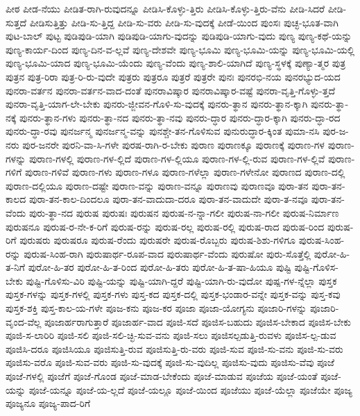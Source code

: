 {ಪೀಠ
ಪೀಡ-ನೆಯು
ಪೀಡಿತ-ರಾಗಿ-ರುವುದನ್ನೂ
ಪೀಡಿಸಿ-ಕೊಳ್ಳು-ತ್ತಿರು
ಪೀಡಿಸಿ-ಕೊಳ್ಳು-ತ್ತಿರು-ವೆನು
ಪೀಡಿ-ಸಿದರೆ
ಪೀಡಿ-ಸುತ್ತದೆ
ಪೀಡಿಸುತ್ತಿತ್ತು
ಪೀಡಿ-ಸು-ತ್ತಿದ್ದ
ಪೀಡಿ-ಸು-ವರು
ಪೀಡಿ-ಸು-ವುದಕ್ಕೆ
ಪೀಡೆ-ಯಿಂದ
ಪುಂಸಃ
ಪುಚ್ಛ-ಭೂತ-ವಾಗಿ
ಪುಟ-ಬಾಲ್
ಪುಟ್ಟ
ಪುಡಿಪುಡಿ-ಯಾಗಿ
ಪುಡಿಪುಡಿ-ಯಾಗು-ವುದನ್ನು
ಪುಡಿಪುಡಿ-ಯಾಗು-ವುದು
ಪುಣ್ಯ
ಪುಣ್ಯ-ಕಥೆ-ಯನ್ನು
ಪುಣ್ಯ-ಕಾರ್ಯ-ದಿಂದ
ಪುಣ್ಯ-ದಿನ-ವ-ಲ್ಲವೆ
ಪುಣ್ಯ-ದೇಶವೇ
ಪುಣ್ಯ-ಭೂಮಿ
ಪುಣ್ಯ-ಭೂಮಿ-ಯನ್ನು
ಪುಣ್ಯ-ಭೂಮಿ-ಯಲ್ಲಿ
ಪುಣ್ಯ-ಭೂಮಿ-ಯಾದ
ಪುಣ್ಯ-ಭೂಮಿ-ಯೆಂದು
ಪುಣ್ಯ-ವೆಂದು
ಪುಣ್ಯ-ಶಾಲಿ-ಯಾಗಿದೆ
ಪುಣ್ಯ-ಸ್ಥಳಕ್ಕೆ
ಪುಣ್ಯಾ-ತ್ಮರ
ಪುತ್ರ
ಪುತ್ರನ
ಪುತ್ರ-ರಿರಾ
ಪುತ್ರ-ರಿ-ರು-ವುದೇ
ಪುತ್ರರು
ಪುತ್ರರೂ
ಪುತ್ರರೆ
ಪುತ್ರರೇ
ಪುನಃ
ಪುನರಭಿ-ನಯ
ಪುನರಭ್ಯುದ-ಯದ
ಪುನರಾ-ವರ್ತನ
ಪುನರಾ-ವರ್ತನ-ವಾದ-ದಂತೆ
ಪುನರಾವಿಷ್ಕಾರ
ಪುನರಾವಿಷ್ಕಾರ-ವಷ್ಟೆ
ಪುನರಾ-ವೃತ್ತಿ-ಗೊಳ್ಳು-ತ್ತದೆ
ಪುನರಾ-ವೃತ್ತಿ-ಯಾಗ-ಲೇ-ಬೇಕು
ಪುನರು-ಜ್ಜೀವನ-ಗೊಳಿ-ಸು-ವುದಕ್ಕೆ
ಪುನರು-ತ್ಥಾನ
ಪುನರು-ತ್ಥಾನ-ಕ್ಕಾಗಿ
ಪುನರು-ತ್ಥಾ-ನಕ್ಕೆ
ಪುನರು-ತ್ಥಾನ-ಗಳು
ಪುನರು-ತ್ಥಾ-ನದ
ಪುನರು-ತ್ಥಾ-ನವು
ಪುನರು-ದ್ಧಾರ
ಪುನರು-ದ್ಧಾರ-ಕ್ಕಾಗಿ
ಪುನರು-ದ್ಧಾ-ರದ
ಪುನರು-ದ್ಧಾ-ರವು
ಪುನರ್ಜನ್ಮ
ಪುನರ್ಜನ್ಮ-ವನ್ನು
ಪುನಶ್ಚೇ-ತನ-ಗೊಳಿಸುವ
ಪುನುರುದ್ಧಾರ-ಕ್ಕಿಂತ
ಪುಮಾ-ನಸಿ
ಪುರ-ಜ-ನರು
ಪುರ-ಜನರೇ
ಪುರನಿ-ವಾ-ಸಿ-ಗಳೇ
ಪುರಷ-ರಾಗಿ-ರ-ಬೇಕು
ಪುರಾಣ
ಪುರಾಣಕ್ಕೂ
ಪುರಾಣಕ್ಕೆ
ಪುರಾಣ-ಗಳ
ಪುರಾಣ-ಗಳನ್ನು
ಪುರಾಣ-ಗಳಲ್ಲಿ
ಪುರಾಣ-ಗಳ-ಲ್ಲಿದೆ
ಪುರಾಣ-ಗಳ-ಲ್ಲಿಯೂ
ಪುರಾಣ-ಗಳ-ಲ್ಲಿ-ರುವ
ಪುರಾಣ-ಗಳ-ಲ್ಲಿವೆ
ಪುರಾಣ-ಗಳಿಗೆ
ಪುರಾಣ-ಗಳಿವೆ
ಪುರಾಣ-ಗಳು
ಪುರಾಣ-ಗಳೂ
ಪುರಾಣ-ಗಳೆಲ್ಲಾ
ಪುರಾಣ-ಗಳೇನೋ
ಪುರಾಣದ
ಪುರಾಣ-ದಲ್ಲಿ
ಪುರಾಣ-ದಲ್ಲಿಯೂ
ಪುರಾಣ-ದಷ್ಟೇ
ಪುರಾಣ-ವನ್ನು
ಪುರಾಣ-ವನ್ನೂ
ಪುರಾಣವು
ಪುರಾಣವೂ
ಪುರಾ-ತನ
ಪುರಾ-ತನ-ಕಾಲದ
ಪುರಾ-ತನ-ಕಾಲ-ದಿಂದಲೂ
ಪುರಾ-ತನ-ವಾದುದಾ-ದರೂ
ಪುರಾ-ತನ-ವಾದುದೇ
ಪುರಾ-ತ-ನವೂ
ಪುರಾ-ತನ-ವೆಂದು
ಪುರು-ತ್ಥಾ-ನದ
ಪುರುಷ
ಪುರುಷಃ
ಪುರುಷನ
ಪುರುಷ-ನ-ನ್ನಾ-ಗಲೀ
ಪುರುಷ-ನಾ-ಗಲೀ
ಪುರುಷ-ನಿರ್ಮಾಣ
ಪುರುಷನೂ
ಪುರುಷ-ರ-ನೇ-ಕ-ರಿಗೆ
ಪುರುಷ-ರನ್ನು
ಪುರುಷ-ರಲ್ಲ
ಪುರುಷ-ರಲ್ಲಿ
ಪುರುಷ-ರಾದ
ಪುರುಷ-ರಿಂದ
ಪುರುಷ-ರಿಗೆ
ಪುರುಷರು
ಪುರುಷರೂ
ಪುರುಷ-ರೆಂದು
ಪುರುಷರೇ
ಪುರುಷ-ರೊಬ್ಬರು
ಪುರುಷ-ಶಿಶು-ಗಳಿಗೂ
ಪುರುಷ-ಸಿಂಹ-ರನ್ನು
ಪುರುಷ-ಸಿಂಹ-ರಾಗಿ
ಪುರುಷಾರ್ಥ-ರೂಪ-ವಾದ
ಪುರುಷಾರ್ಥ-ವೆಂದು
ಪುರುಷೋ
ಪುರು-ಸೊತ್ತೆಲ್ಲಿ
ಪುರೋ-ಹಿ-ತ-ನಿಗೆ
ಪುರೋ-ಹಿ-ತರ
ಪುರೋ-ಹಿ-ತ-ರಿಂದ
ಪುರೋ-ಹಿ-ತರು
ಪುರೋ-ಹಿ-ತ-ಷಾ-ಹಿಯೂ
ಪುಷ್ಟಿ
ಪುಷ್ಟಿ-ಗೊಳಿಸ-ಬೇಕು
ಪುಷ್ಟಿ-ಗೊಳಿಸು-ವಿರಿ
ಪುಷ್ಟಿ-ಯನ್ನು
ಪುಷ್ಟಿ-ಯಾಗಿ-ದ್ದರೆ
ಪುಷ್ಟಿ-ಯಾಗಿ-ರು-ವುದೋ
ಪುಷ್ಪ-ಗಳ-ನ್ನೆಲ್ಲಾ
ಪುಸ್ತಕ
ಪುಸ್ತಕ-ಗಳನ್ನು
ಪುಸ್ತಕ-ಗಳಲ್ಲಿ
ಪುಸ್ತಕ-ಗಳು
ಪುಸ್ತ-ಕದ
ಪುಸ್ತಕ-ದಲ್ಲಿ
ಪುಸ್ತಕ-ಭಂಡಾರ-ವನ್ನೇ
ಪುಸ್ತಕ-ವನ್ನು
ಪುಸ್ತ-ಕವು
ಪುಸ್ತಕ-ಶಕ್ತಿ
ಪುಸ್ತ-ಕಾಲ-ಯ-ಗಳೇ
ಪೂಜ-ಕನು
ಪೂಜ-ಕರ
ಪೂಜಾ
ಪೂಜಾ-ಯೋಗ್ಯನು
ಪೂಜಾರಿ-ಗಳನ್ನು
ಪೂಜಾರಿ-ವೃಂದ-ವೆಲ್ಲ
ಪೂಜಾರ್ಹರಾಗುತ್ತಾರೆ
ಪೂಜಾರ್ಹ-ವಾದ
ಪೂಜಿ-ಸದೆ
ಪೂಜಿಸ-ಬಹುದು
ಪೂಜಿಸ-ಬೇಕಾದ
ಪೂಜಿಸ-ಬೇಕು
ಪೂಜಿ-ಸ-ಲಾರಿರಿ
ಪೂಜಿ-ಸಲಿ
ಪೂಜಿ-ಸಲಿ-ಚ್ಛಿ-ಸುವ-ವನು
ಪೂಜಿ-ಸಲು
ಪೂಜಿಸಲ್ಪಡುತ್ತಿ-ರುವಳು
ಪೂಜಿಸ-ಲ್ಪ-ಡುವ
ಪೂಜಿಸಿ-ದರೂ
ಪೂಜಿಸಿಯೂ
ಪೂಜಿಸುತ್ತಿ-ರುವ
ಪೂಜಿಸುತ್ತಿ-ರು-ವರು
ಪೂಜಿ-ಸುವ
ಪೂಜಿ-ಸು-ವನು
ಪೂಜಿ-ಸು-ವರು
ಪೂಜಿಸು-ವರೊ
ಪೂಜಿ-ಸುವ-ವರು
ಪೂಜಿ-ಸು-ವುದಕ್ಕೆ
ಪೂಜಿ-ಸು-ವುದಿಲ್ಲ
ಪೂಜಿಸು-ವುದು
ಪೂಜಿಸು-ವೆವು
ಪೂಜೆ
ಪೂಜೆ-ಗಳಲ್ಲಿ
ಪೂಜೆಗೆ
ಪೂಜೆ-ಗೊಂಡ
ಪೂಜೆ-ಮಾಡ-ಬೇಕೆಂದು
ಪೂಜೆ-ಮಾಡುವ
ಪೂಜೆಯ
ಪೂಜೆ-ಯಂತೆ
ಪೂಜೆ-ಯನ್ನು
ಪೂಜೆ-ಯನ್ನೂ
ಪೂಜೆ-ಯ-ಲ್ಲದೆ
ಪೂಜೆ-ಯಲ್ಲೂ
ಪೂಜೆ-ಯಿಂದ
ಪೂಜೆಯು
ಪೂಜೆ-ಯೆಲ್ಲಾ
ಪೂಜೆಯೇ
ಪೂಜ್ಯ
ಪೂಜ್ಯನೂ
ಪೂಜ್ಯ-ಪಾದ-ರಿಗೆ
}
